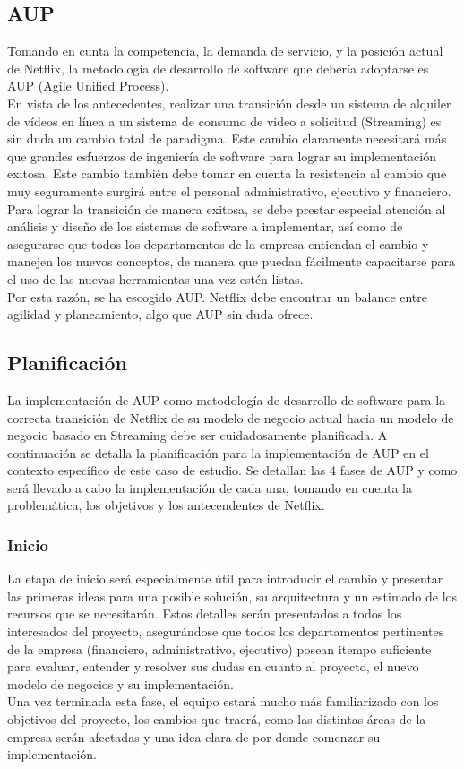 \documentclass{article}
\begin{document}
\subsection{AUP}
Tomando en cunta la competencia, la demanda de servicio, y la 
posición actual de Netflix, la metodología de desarrollo de software 
que debería adoptarse es AUP (Agile Unified Process). \\
En vista de los antecedentes, realizar una transición 
desde un sistema de alquiler de vídeos en línea a un sistema de
consumo de video a solicitud (Streaming) es sin duda un cambio total
de paradigma. Este cambio claramente necesitará más que grandes 
esfuerzos de ingeniería de software para lograr su implementación
exitosa.  Este cambio también debe tomar en cuenta la resistencia
al cambio que muy seguramente surgirá entre el personal
administrativo, ejecutivo y financiero. Para lograr la transición
de manera exitosa, se debe prestar especial atención al análisis
y diseño de los sistemas de software a implementar, así como de 
asegurarse que todos los departamentos de la empresa entiendan
el cambio y manejen los nuevos conceptos, de manera que 
puedan fácilmente capacitarse para el uso de las nuevas
herramientas una vez estén listas. \\
Por esta razón, se ha escogido AUP. Netflix debe encontrar un 
balance entre agilidad y planeamiento, algo que AUP sin duda ofrece.
\subsection{Planificación}
La implementación de AUP como metodología de desarrollo de
software para la correcta transición de Netflix de su modelo
de negocio actual hacia un modelo de negocio basado en Streaming
debe ser cuidadosamente planificada. A continuación se detalla la
planificación para la implementación de AUP en el contexto específico
de este caso de estudio. Se detallan las 4 fases de AUP y como 
será llevado a cabo la implementación de cada una, tomando en cuenta
la problemática, los objetivos y los antecendentes de Netflix.
\subsubsection{Inicio}
La etapa de inicio será especialmente útil para introducir el 
cambio y presentar las primeras ideas para una posible solución, su 
arquitectura y un estimado de los recursos que se necesitarán.
Estos detalles serán presentados a todos los interesados del proyecto,
asegurándose que todos los departamentos pertinentes de la empresa
(financiero, administrativo, ejecutivo) posean itempo suficiente
para evaluar, entender y resolver sus dudas en cuanto al proyecto,
el nuevo modelo de negocios y su implementación. \\
Una vez terminada esta fase, el equipo estará mucho más familiarizado
con los objetivos del proyecto, los cambios que traerá, como las
distintas áreas de la empresa serán afectadas y una idea clara
de por donde comenzar su implementación.
\end{document}
